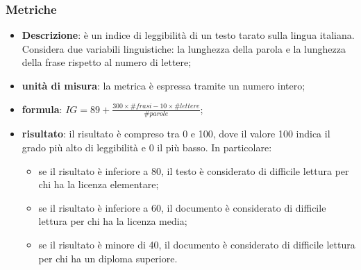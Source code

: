 	\subsubsection{Metriche}
			\begin{itemize}
				\item{\textbf{Descrizione}}: è un indice di leggibilità di un testo tarato sulla lingua italiana. Considera due variabili linguistiche: la lunghezza della parola e la lunghezza della frase rispetto al numero di lettere;
				\item{\textbf{unità di misura}}: la metrica è espressa tramite un numero intero;
				\item{\textbf{formula}}: $ IG=89+\frac{300 \times \#frasi -10\times \#lettere}{\#parole} $;
				\item{\textbf{risultato}}: il risultato è compreso tra 0 e 100, dove il valore 100 indica il grado più alto di leggibilità e 0 il più basso. In particolare:
					\begin{itemize}
						\item se il risultato è inferiore a 80, il testo è considerato di difficile lettura per chi ha la licenza elementare;
						\item se il risultato è inferiore a 60, il documento è considerato di difficile lettura per chi ha la licenza media;
						\item se il risultato è minore di 40, il documento è considerato di difficile lettura per chi ha un diploma superiore.
					\end{itemize}
			\end{itemize}

